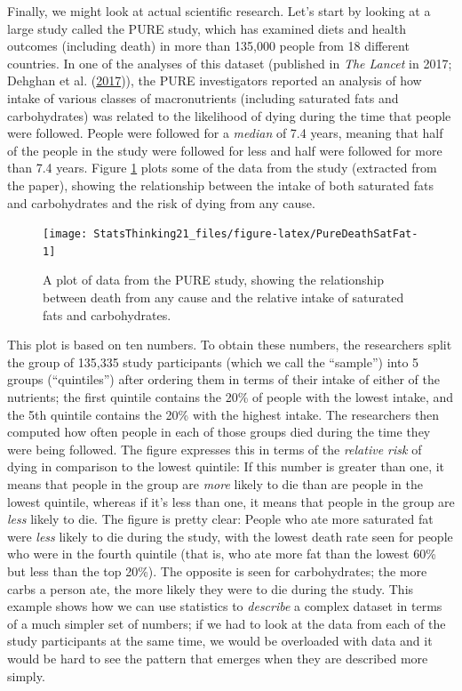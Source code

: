 \documentclass[12pt,]{book}
\theoremstyle{definition}
\theoremstyle{definition}
\theoremstyle{definition}
\theoremstyle{remark}
\begin{document}
Finally, we might look at actual scientific research. Let's start by looking at a large study called the PURE study, which has examined diets and health outcomes (including death) in more than 135,000 people from 18 different countries. In one of the analyses of this dataset (published in \emph{The Lancet} in 2017; Dehghan et al. (\protect\hyperlink{ref-dehg:ment:zhan:2017}{2017})), the PURE investigators reported an analysis of how intake of various classes of macronutrients (including saturated fats and carbohydrates) was related to the likelihood of dying during the time that people were followed. People were followed for a \emph{median} of 7.4 years, meaning that half of the people in the study were followed for less and half were followed for more than 7.4 years. Figure \ref{fig:PureDeathSatFat} plots some of the data from the study (extracted from the paper), showing the relationship between the intake of both saturated fats and carbohydrates and the risk of dying from any cause.

\begin{figure}
\texttt{[image: StatsThinking21\_files/figure-latex/PureDeathSatFat-1]} \caption{A plot of data from the PURE study, showing the relationship between death from any cause and the relative intake of saturated fats and carbohydrates.}\label{fig:PureDeathSatFat}
\end{figure}

This plot is based on ten numbers. To obtain these numbers, the researchers split the group of 135,335 study participants (which we call the ``sample'') into 5 groups (``quintiles'') after ordering them in terms of their intake of either of the nutrients; the first quintile contains the 20\% of people with the lowest intake, and the 5th quintile contains the 20\% with the highest intake. The researchers then computed how often people in each of those groups died during the time they were being followed. The figure expresses this in terms of the \emph{relative risk} of dying in comparison to the lowest quintile: If this number is greater than one, it means that people in the group are \emph{more} likely to die than are people in the lowest quintile, whereas if it's less than one, it means that people in the group are \emph{less} likely to die. The figure is pretty clear: People who ate more saturated fat were \emph{less} likely to die during the study, with the lowest death rate seen for people who were in the fourth quintile (that is, who ate more fat than the lowest 60\% but less than the top 20\%). The opposite is seen for carbohydrates; the more carbs a person ate, the more likely they were to die during the study. This example shows how we can use statistics to \emph{describe} a complex dataset in terms of a much simpler set of numbers; if we had to look at the data from each of the study participants at the same time, we would be overloaded with data and it would be hard to see the pattern that emerges when they are described more simply.
\end{document}
